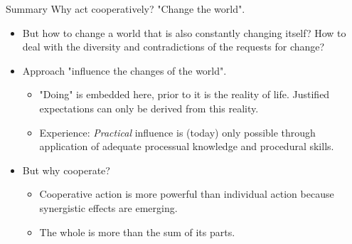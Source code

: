 \documentclass{beamer}
\begin{document}
\begin{frame}{Summary}
Why act cooperatively? "Change the world".
\begin{itemize}
\item But how to change a world that is also constantly changing itself?  How
  to deal with the diversity and contradictions of the requests for change?
\item Approach "influence the changes of the world".
  \begin{itemize}
  \item "Doing" is embedded here, prior to it is the reality of life.
    Justified expectations can only be derived from this reality.
\item Experience: \emph{Practical} influence is (today) only possible through
  application of adequate processual knowledge and procedural skills.
  \end{itemize}
\item But why cooperate?
  \begin{itemize}
  \item Cooperative action is more powerful than individual action because
    synergistic effects are emerging.
  \item The whole is more than the sum of its parts.
  \end{itemize}
\end{itemize}
\end{frame}
\end{document}

